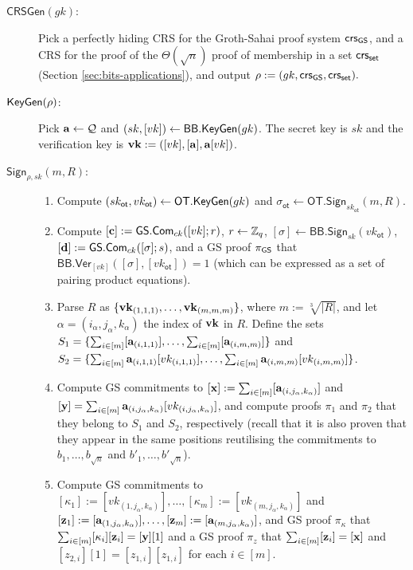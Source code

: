 \begin{description}
\item[$\mathsf{CRSGen}(gk)$:] Pick a perfectly hiding CRS for the Groth-Sahai proof system $\mathsf{crs}_{\mathsf{GS}}$, and a CRS for the proof of the $\Theta(\sqrt{n})$ proof of membership in a set $\mathsf{crs}_{\mathsf{set}}$ (Section \ref{sec:bits-applications}), and output $\rho:=(gk,\mathsf{crs}_{\mathsf{GS}},\mathsf{crs}_{\mathsf{set}}).$
\item[$\mathsf{KeyGen}(\rho)$:] Pick $\mathbf{a}\gets\mathcal{Q}$ and $(sk,[vk])\gets\mathsf{BB}.\mathsf{KeyGen}(gk)$. The secret key is $sk$ and the verification key is $\mathbf{vk}:=([vk],[\mathbf{a}],\mathbf{a}[vk])$.
\item[$\mathsf{Sign}_{\rho,sk}(m,R)$:]
\begin{enumerate}
\item Compute $(sk_\mathsf{ot},vk_\mathsf{ot})\gets\mathsf{OT}.\mathsf{KeyGen}(gk)$ and $\sigma_\mathsf{ot}\gets\mathsf{OT}.\mathsf{Sign}_{sk_\mathsf{ot}}(m,R)$.
\item Compute $[\mathbf{c}]:={\mathsf{GS}}.\mathsf{Com}_{ck}([vk];r)$, $r\gets\mathbb{Z}_q$, $[\sigma]\gets\mathsf{BB}.\mathsf{Sign}_{sk}(vk_\mathsf{ot})$, $[\mathbf{d}]:={\mathsf{GS}}.\mathsf{Com}_{ck}([\sigma];s)$, and a GS proof $\pi_{\mathsf{GS}}$ that $\mathsf{BB}.\mathsf{Ver}_{[vk]}([\sigma],[vk_\mathsf{ot}])=1$ (which can be expressed as a set of pairing product equations).
\item Parse $R$ as $\{\mathbf{vk}_{(1,1,1)},\ldots,\mathbf{vk}_{(m,m,m)}\}$, where $m:=\sqrt[3]{|R|}$, and let $\alpha=(i_\alpha,j_\alpha,k_\alpha)$ the index of $\mathbf{vk}$ in $R$. Define the sets $S_1=\{\sum_{i\in[m]}[\mathbf{a}_{(i,1,1)}],\allowbreak\ldots,\sum_{i\in[m]}[\mathbf{a}_{(i,m,m)}]\}$ and $S_2=\{\sum_{i\in[m]}\mathbf{a}_{(i,1,1)}[vk_{(i,1,1)}],\allowbreak\ldots,\sum_{i\in[m]}\mathbf{a}_{(i,m,m)}[vk_{(i,m,m)}]\}$.
\item Compute GS commitments to $[\mathbf{x}]:=\sum_{i\in[m]}[\mathbf{a}_{(i,j_\alpha,k_\alpha)}]$ and $[\mathbf{y}]=\sum_{i\in[m]}\mathbf{a}_{(i,j_\alpha,k_\alpha)}[vk_{(i,j_\alpha,k_\alpha)}]$, and compute proofs $\pi_1$ and $\pi_2$ that they belong to $S_1$ and $S_2$, respectively (recall that it is also proven that they appear in the same positions reutilising the commitments to $b_1,\ldots,b_{\sqrt{n}}$ and $b'_1,\ldots,b'_{\sqrt{n}}$).
\item Compute GS commitments to $[\kappa_1]:=[vk_{(1,j_\alpha,k_\alpha)}],\ldots,[\kappa_m]:=[vk_{(m,j_\alpha,k_\alpha)}]$ and $[\mathbf{z}_1]:=[\mathbf{a}_{(1,j_\alpha,k_\alpha)}],\ldots,[\mathbf{z}_m]:=[\mathbf{a}_{(m,j_\alpha,k_\alpha)}]$, and GS proof $\pi_\kappa$ that $\sum_{i\in[m]}[\kappa_i][\mathbf{z}_i]=[\mathbf{y}][1]$ and a GS proof $\pi_{z}$ that $\sum_{i\in[m]}[\mathbf{z}_i]=[\mathbf{x}]$ and $[z_{2,i}][1]=[z_{1,i}][z_{1,i}]$ for each $i\in[m]$.

\end{enumerate}
\end{description}
